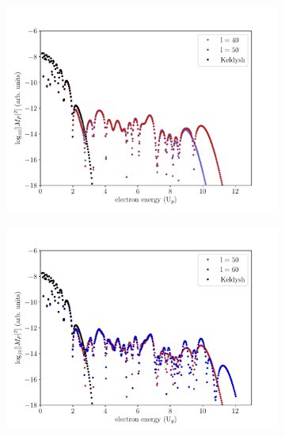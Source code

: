 \begin{figure}
\begin{subfigure}[b]{0.5\linewidth}
  \includegraphics[width=\textwidth]{figures/ch_ATI_SFA/He/l4050n512WP40PG25MR35vsKeldysh.pdf}
\end{subfigure}
\begin{subfigure}[b]{0.5\linewidth}
  \includegraphics[width=\textwidth]{figures/ch_ATI_SFA/He/l5060n512WP40PG25MR35vsKeldysh.pdf}
\end{subfigure}
\begin{subfigure}[b]{0.5\linewidth}

\end{subfigure}
\end{figure}

